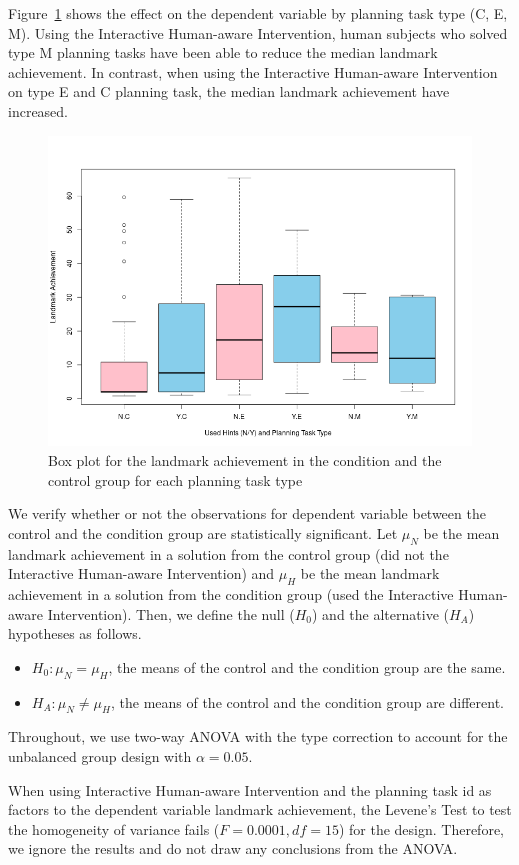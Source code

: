 Figure~\ref{fig:achbytype} shows the effect on the dependent variable by planning task type (C, E, M).
Using the Interactive Human-aware Intervention, human subjects who solved type M planning tasks have been able to reduce the median landmark achievement.
In contrast, when using the Interactive Human-aware Intervention on type E and C planning task, the median landmark achievement have increased.
\begin{figure}[tpb]
  \centering
\includegraphics[width=0.7\columnwidth]{img/achbytype.png}
  \caption{Box plot for the landmark achievement in the condition and the control group for each planning task type}
  \label{fig:achbytype}
\end{figure}

We verify whether or not the observations for dependent variable between the control and the condition group are statistically significant.
Let $\mu_N$ be the mean landmark achievement in a solution from the control group (did not the Interactive Human-aware Intervention) and $\mu_H$ be the mean landmark achievement in a solution from the condition group (used the Interactive Human-aware Intervention).
Then, we define the null ($H_0$) and the alternative ($H_A$) hypotheses as follows.
\begin{itemize}
\item $H_0: \mu_N = \mu_H$, the means of the control and the condition group are the same.
\item $H_A: \mu_N \neq \mu_H$, the means of the control and the condition group are different.
\end{itemize}
Throughout, we use two-way ANOVA with the type  correction to account for the unbalanced group design with $\alpha=0.05$.

When using Interactive Human-aware Intervention and the planning task id as factors to the dependent variable landmark achievement, the Levene's Test to test the homogeneity of variance fails ($F=0.0001, df=15$) for the design.
Therefore, we ignore the results and do not draw any conclusions from the ANOVA.

